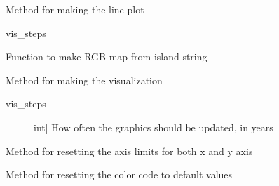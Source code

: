 \documentclass[a4paper,10pt,english]{sphinxmanual}
\begin{document}
\begin{fulllineitems}
\begin{fulllineitems}
\end{fulllineitems}


\begin{fulllineitems}
\label{\detokenize{simulation:biosim.simulation.BioSim.make_line_plot}}
Method for making the line plot

vis\_steps

\end{fulllineitems}


\begin{fulllineitems}
\label{\detokenize{simulation:biosim.simulation.BioSim.make_rgb_map}}
Function to make RGB map from island-string

\end{fulllineitems}


\begin{fulllineitems}
\label{\detokenize{simulation:biosim.simulation.BioSim.make_visualization}}
Method for making the visualization
\begin{description}
\item[{vis\_steps}] \leavevmode{[}int{]}
How often the graphics should be updated, in years

\end{description}

\end{fulllineitems}


\begin{fulllineitems}
\label{\detokenize{simulation:biosim.simulation.BioSim.reset_axis_limits}}
Method for resetting the axis limits for both x and y axis

\end{fulllineitems}


\begin{fulllineitems}
\label{\detokenize{simulation:biosim.simulation.BioSim.reset_color_code_limits}}
Method for resetting the color code to default values


\end{fulllineitems}
\end{fulllineitems}
\end{document}
